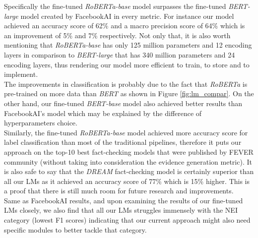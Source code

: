 \documentclass[conference]{IEEEtran}
\begin{document}
Specifically the fine-tuned \textit{RoBERTa-base} model surpasses the fine-tuned \textit{BERT-large} model created by FacebookAI in every metric. For instance our model achieved an accuracy score of 62\% and a macro precision score of 64\% which is an improvement of 5\% and 7\% respectively. Not only that, it is also worth mentioning that \textit{RoBERTa-base} has only 125 million parameters and 12 encoding layers in comparison to \textit{BERT-large} that has 340 million parameters and 24 encoding layers, thus rendering our model more efficient to train, to store and to implement.\\

The improvements in classification is probably due to the fact that \textit{RoBERTa} is pre-trained on more data than \textit{BERT} as shown in Figure \ref{fig:lm_compar}. On the other hand, our fine-tuned \textit{BERT-base} model also achieved better results than FacebookAI's model which may be explained by the difference of hyperparameters choice.\\

Similarly, the fine-tuned \textit{RoBERTa-base} model achieved more accuracy score for label classification than most of the traditional pipelines, therefore it puts our approach on the top-10 best fact-checking models that were published by FEVER community\cite{thorne2018fact} (without taking into consideration the evidence generation metric). It is also safe to say that the \textit{DREAM} fact-checking model is certainly superior than all our LMs as it achieved an accuracy score of 77\% which is 15\% higher. This is a proof that there is still much room for future research and improvements.\\

Same as FacebookAI results\cite{lee2020language}, and upon examining the results of our fine-tuned LMs closely, we also find that all our LMs struggles immensely with the NEI category (lowest F1 scores) indicating that our current approach might also need specific modules to better tackle that category.\\

\end{document}
